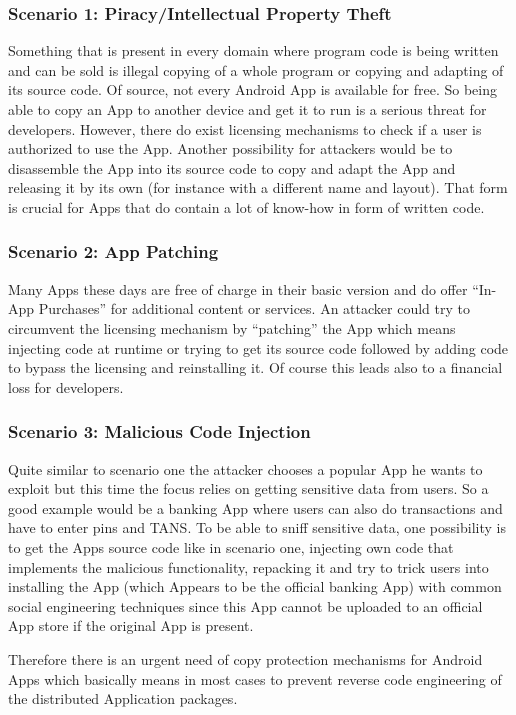 \subsubsection*{Scenario 1: Piracy/Intellectual Property Theft}
Something that is present in every domain where program code is being written
and can be sold is illegal copying of a whole program or copying and adapting of
its source code. Of source, not every Android App is available for free. So being
able to copy an App to another device and get it to run is a serious threat for developers. However, there do exist licensing mechanisms to check if a user is 
authorized to use the App. Another possibility for attackers would be to disassemble
the App into its source code to copy and adapt the App and releasing it by its own
(for instance with a different name and layout).
That form is crucial for Apps that do contain a lot of know-how in form of written code.



\subsubsection*{Scenario 2: App Patching}
Many Apps these days are free of charge in their basic version and
do offer ``In-App Purchases'' for additional content or services.
An attacker could try to circumvent the licensing mechanism 
by ``patching'' the App which means injecting code at runtime or trying to get its source
code followed by adding code to bypass the licensing and reinstalling it. Of course this
leads also to a financial loss for developers. 

\subsubsection*{Scenario 3: Malicious Code Injection}
Quite similar to scenario one the attacker chooses a popular App he wants to exploit 
but this time the focus relies on getting sensitive data from users. So a good example
would be a banking App where users can also do transactions and have to enter pins and TANS. To be able to sniff sensitive data, one possibility is to get the Apps source code
like in scenario one, injecting own code that implements the malicious functionality, repacking it and try to trick users into installing the App (which Appears to be the
official banking App) with common social engineering techniques since this App cannot be
uploaded to an official App store if the original App is present. 



Therefore there is an urgent need of copy protection mechanisms
for Android Apps which basically means in most cases to prevent reverse code engineering of the distributed Application packages. 
